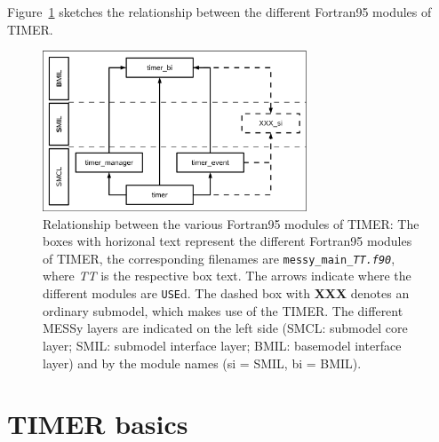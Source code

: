 \documentclass[twoside]{article}
\begin{document}
Figure~\ref{fig:timermodules} sketches the relationship between
the different Fortran95 modules of TIMER.
%
\begin{figure}
  \centerline{\includegraphics[width=0.7\textwidth]{timer_modules}}
  \caption[Relationship between TIMER modules] {Relationship between the
          various Fortran95 modules of TIMER: The boxes with horizonal
          text represent the different Fortran95 modules of TIMER, the
          corresponding filenames are {\tt messy\_main\_{\it TT.f90}}, where
          {\it TT} is the respective box text. The arrows indicate where the
          different modules are {\tt USE}d.  The dashed box with {\bf XXX}
          denotes an ordinary submodel, which makes use of the TIMER.  The
          different MESSy layers are indicated on the left side (SMCL:
          submodel core layer; SMIL: submodel interface layer; BMIL: basemodel
          interface layer) and by the module names (si = SMIL, bi = BMIL).  }
  \label{fig:timermodules}
\end{figure}
%

\section{TIMER basics}
\label{sec:timer}

\end{document}
